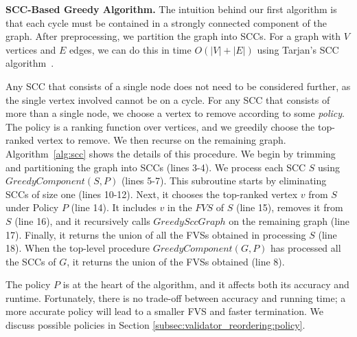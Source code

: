 \begin{algorithm}[t]
\SetAlgoLined\DontPrintSemicolon
{}
\caption{Sort-based greedy algorithm}
\label{alg:sort}
\end{algorithm}




{\bf SCC-Based Greedy Algorithm.} The intuition behind our first algorithm is that each cycle must be contained in a strongly connected component of the graph. After preprocessing, we partition the graph into SCCs. For a graph with $V$ vertices and $E$ edges, we can do this in time $O(|V|+|E|)$ using Tarjan's SCC algorithm~\cite{tarjan1972depth}.

Any SCC that consists of a single node does not need to be considered further, as the single vertex involved cannot be on a cycle. For any SCC that consists of more than a single node, we choose a vertex to remove according to some \emph{policy}. The policy is a ranking function over vertices, and we greedily choose the top-ranked vertex to remove. We then recurse on the remaining graph. Algorithm~\ref{alg:scc} shows the details of this procedure. We begin by trimming and partitioning the graph into SCCs  (lines 3-4). We process each SCC $S$ using $GreedyComponent(S, P)$ (lines 5-7). This subroutine starts by eliminating SCCs of size one (lines 10-12). Next, it chooses the top-ranked vertex $v$ from $S$ under Policy $P$ (line 14). It includes $v$ in the $FVS$ of $S$ (line 15), removes it from $S$ (line 16), and it recursively calls $GreedySccGraph$ on the remaining graph (line 17). Finally, it returns the union of all the FVSs obtained in processing $S$ (line 18). When the top-level procedure $GreedyComponent(G, P)$ has processed all the SCCs of $G$, it returns the union of the FVSs obtained (line 8).

The policy $P$ is at the heart of the algorithm, and it affects both its accuracy and runtime. Fortunately, there is no trade-off between accuracy and running time; a more accurate policy will lead to a smaller FVS and faster termination. We discuss possible policies in Section \ref{subsec:validator_reordering:policy}.


